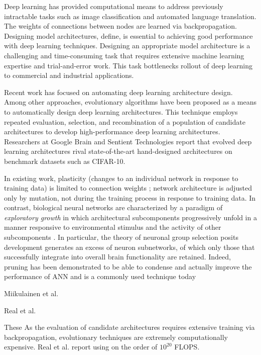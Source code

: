 Deep learning has provided computational means to address previously intractable tasks such as image classification and automated language translation.
The weights of connections between nodes are learned via backpropagation.
Designing model architectures, define, is essential to achieving good performance with deep learning techniques.
Designing an appropriate model architecture is a challenging and time-consuming task that requires extensive machine learning expertise and trial-and-error work.
This task bottlenecks rollout of deep learning to commercial and industrial applications.

Recent work has focused on automating deep learning architecture design.
Among other approaches, evolutionary algorithms have been proposed as a means to automatically design deep learning architectures.
This technique employs repeated evaluation, selection, and recombination of a population of candidate architectures to develop high-performance deep learning architectures.
Researchers at Google Brain and Sentient Technologies report that evolved deep learning architectures rival state-of-the-art hand-designed architectures on benchmark datasets such as CIFAR-10.

In existing work, plasticity (changes to an individual network in response to training data) is limited to connection weights \cite{miikkulainen2017evolving, real2017large};
network architecture is adjusted only by mutation, not during the training process in response to training data.
In contrast, biological neural networks are characterized by a paradigm of \textit{exploratory growth} in which architectural subcomponents progressively unfold in a manner responsive to environmental stimulus and the activity of other subcomponents \cite{downing2015intelligence}.
\cite{sanes2011development}
In particular, the theory of neuronal group selection posits development generates an excess of neuron subnetworks, of which only those that successfully integrate into overall brain functionality are retained.
Indeed, pruning  has been demonstrated to be able to condense and actually improve the performance of ANN and is a commonly used technique today \cite{wen2016learning}


Miikulainen et al.



Real et al.

\cite{real2017large}

These
As the evaluation of candidate architectures requires extensive training via backpropagation, evolutionary techniques are extremely computationally expensive.
Real et al. report using on the order of $10^{20}$ FLOPS.

